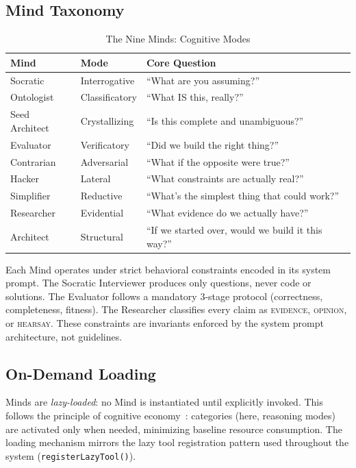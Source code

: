 \documentclass[journal,10pt]{IEEEtran}
\newcommand{\code}[1]{\texttt{#1}}
\begin{document}
\subsection{Mind Taxonomy}

\begin{table}[!t]
\caption{The Nine Minds: Cognitive Modes}
\label{tab:minds}
\centering
\scriptsize
\begin{tabularx}{\columnwidth}{@{}l l X@{}}
\toprule
\textbf{Mind} & \textbf{Mode} & \textbf{Core Question} \\
\midrule
Socratic & Interrogative & ``What are you assuming?'' \\
Ontologist & Classificatory & ``What IS this, really?'' \\
Seed Architect & Crystallizing & ``Is this complete and unambiguous?'' \\
Evaluator & Verificatory & ``Did we build the right thing?'' \\
Contrarian & Adversarial & ``What if the opposite were true?'' \\
Hacker & Lateral & ``What constraints are actually real?'' \\
Simplifier & Reductive & ``What's the simplest thing that could work?'' \\
Researcher & Evidential & ``What evidence do we actually have?'' \\
Architect & Structural & ``If we started over, would we build it this way?'' \\
\bottomrule
\end{tabularx}
\end{table}

Each Mind operates under strict behavioral constraints encoded in its system prompt. The Socratic Interviewer produces only questions, never code or solutions. The Evaluator follows a mandatory 3-stage protocol (correctness, completeness, fitness). The Researcher classifies every claim as \textsc{evidence}, \textsc{opinion}, or \textsc{hearsay}. These constraints are invariants enforced by the system prompt architecture, not guidelines.

\subsection{On-Demand Loading}

Minds are \emph{lazy-loaded}: no Mind is instantiated until explicitly invoked. This follows the principle of cognitive economy~\cite{rosch1978}: categories (here, reasoning modes) are activated only when needed, minimizing baseline resource consumption. The loading mechanism mirrors the lazy tool registration pattern used throughout the system (\code{registerLazyTool()}).
\end{document}
